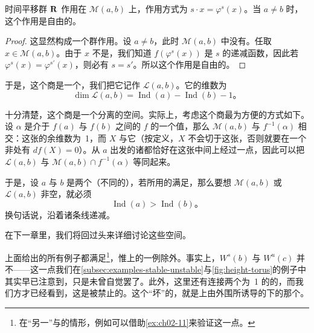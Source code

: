 \begin{proposition}\label{thm:translation-action-free}
时间平移群 $\mathbf{R}$ 作用在 $\mathcal{M}(a,b)$ 上，作用方式为 $s\cdot x=\varphi^s(x)$。当 $a\neq b$ 时，这个作用是自由的。
\end{proposition}

\begin{proof}
这显然构成一个群作用。设 $a\neq b$，此时 $\mathcal{M}(a,b)$ 中没有\trCriticalPoint。任取 $x\in\mathcal{M}(a,b)$。由于 $x$ 不是\trCriticalPoint，我们知道 $f(\varphi^s(x))$ 是 $s$ 的递减函数，因此若 $\varphi^s(x)=\varphi^{s'}(x)$，则必有 $s=s'$。所以这个作用是自由的。
\end{proof}

于是，这个商是一个\trManifold，我们把它记作 $\mathcal{L}(a,b)$。它的维数为
\[
\dim\mathcal{L}(a,b)=\operatorname{Ind}(a)-\operatorname{Ind}(b)-1\text{。}
\]

\begin{remark}\label{thm:quotient-level-set}
十分清楚，这个商是一个分离的空间。实际上，考虑这个商最为方便的方式如下。设 $\alpha$ 是介于 $f(a)$ 与 $f(b)$ 之间的 $f$ 的一个值，那么 $\mathcal{M}(a,b)$ 与\trLevelSet{} $f^{-1}(\alpha)$ \trTransverse{}相交：这张\trLevelSet{}的余维数为~1，而\trVectorField{} $X$ 与它\trTransverse{}（按定义，$X$ 不会切于这张\trLevelSet，否则就要在一个非\trCriticalPoint{}处有 $df(X)=0$）。从 $a$ 出发的诸\trTrajectory{}都恰好在这张中间\trLevelSet{}上经过一点，因此可以把 $\mathcal{L}(a,b)$ 与 $\mathcal{M}(a,b)\cap f^{-1}(\alpha)$ 等同起来。
\end{remark}

于是，设 $a$ 与 $b$ 是两个（不同的）\trCriticalPoint，若所用的\trGradient{}满足\trSmaleCondition，那么要想 $\mathcal{M}(a,b)$ 或 $\mathcal{L}(a,b)$ 非空，就必须
\[
\operatorname{Ind}(a)>\operatorname{Ind}(b)\text{。}
\]
换句话说，\trIndex{}沿着诸条\trGradient{}线递减。

在下一章里，我们将回过头来详细讨论这些空间。

\begin{example}\label{thm:examples-smale-condition}
上面给出的所有例子都满足\trSmaleCondition\footnote{在“另一”\trSphere{}与\trProjectivePlane{}的情形，例如可以借助\cref{ex:ch02-11}来验证这一点。}，惟\trTorus{}上的\trHeightFunction{}一例除外。事实上，$W^s(b)$ 与 $W^u(c)$ 并不\trTransverse——这一点我们在\cref{subsec:examples-stable-unstable}与\cref{fig:height-torus}的例子中其实早已注意到，只是未曾自觉罢了。此外，这里还有连接两个\trIndex{}为~1 的\trCriticalPoint{}的\trTrajectory，而我们方才已经看到，这是被禁止的。这个“坏”的\trVectorField，就是\trTorus{}上由外围\trEuclidean{}\trMetric{}所诱导的\trRiemann{}\trMetric{}下的那个\trGradient。
\end{example}

